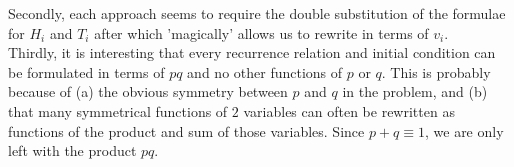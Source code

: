\documentclass[a4paper,10pt]{article}
\begin{document}
\begin{flushleft}
Secondly, each approach seems to require the double substitution of the formulae for $H_i$ and $T_i$ after which 'magically' allows us to rewrite in terms of $v_i$. \\
Thirdly, it is interesting that every recurrence relation and initial condition can be formulated in terms of $pq$ and no other functions of $p$ or $q$. 
This is probably because of (a) the obvious symmetry between $p$ and $q$ in the problem, 
and (b) that many symmetrical functions of $2$ variables can often be rewritten as functions of the product and sum of those variables. 
Since $p+q \equiv 1$, we are only left with the product $pq$.  








\end{flushleft}
\end{document}

